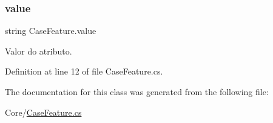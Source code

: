 \subsubsection{\texorpdfstring{value}{value}}
{\footnotesize\ttfamily string Case\+Feature.\+value}



Valor do atributo. 



Definition at line 12 of file Case\+Feature.\+cs.



The documentation for this class was generated from the following file\+:\begin{DoxyCompactItemize}
\item 
Core/\hyperlink{_case_feature_8cs}{Case\+Feature.\+cs}\end{DoxyCompactItemize}
